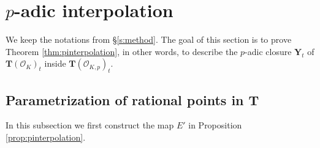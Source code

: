 \documentclass[11pt,oneside]{amsart}
\theoremstyle{plain}
\theoremstyle{definition}
\DeclareMathOperator{\im}{Im}
\def\TT{\mathbf{T}}
\def\Z{\mathbb{Z}}
\def\Y{\mathbf{Y}}
\def\oh{\mathcal{O}}
\begin{document}








\section{$p$-adic interpolation}\label{s:closure}

We keep the notations from \S \ref{s:method}.  The goal of this section is to prove Theorem \ref{thm:pinterpolation}, in other words, to describe the $p$-adic closure $\Y_t$ of $\TT(\oh_K)_t$ inside $\TT(\oh_{K, p})_t$. 


\subsection{Parametrization of rational points in $\TT$}\label{s:construct} In this subsection we first construct the map $E'$ in Proposition \ref{prop:pinterpolation}. 
\end{document}
